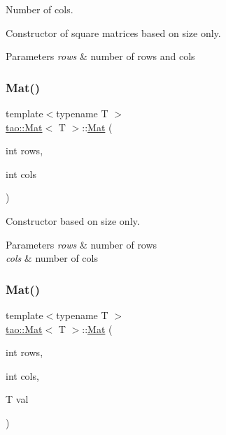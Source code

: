 Number of cols. 

Constructor of square matrices based on size only.


\begin{DoxyParams}{Parameters}
{\em rows} & number of rows and cols \\
\hline
\end{DoxyParams}
\mbox{\label{classtao_1_1_mat_a8b2f68a1f5539462e6f4186bc5f8a5c7}} 
\subsubsection{\texorpdfstring{Mat()}{Mat()}\hspace{0.1cm}{\footnotesize\ttfamily [2/5]}}
{\footnotesize\ttfamily template$<$typename T $>$ \\
\mbox{\hyperlink{classtao_1_1_mat}{tao\+::\+Mat}}$<$ T $>$\+::\mbox{\hyperlink{classtao_1_1_mat}{Mat}} (\begin{DoxyParamCaption}\item[{int}]{rows,  }\item[{int}]{cols }\end{DoxyParamCaption})}



Constructor based on size only. 


\begin{DoxyParams}{Parameters}
{\em rows} & number of rows \\
\hline
{\em cols} & number of cols \\
\hline
\end{DoxyParams}
\mbox{\label{classtao_1_1_mat_a83589751aea3dcecc363068fd540a930}} 
\subsubsection{\texorpdfstring{Mat()}{Mat()}\hspace{0.1cm}{\footnotesize\ttfamily [3/5]}}
{\footnotesize\ttfamily template$<$typename T $>$ \\
\mbox{\hyperlink{classtao_1_1_mat}{tao\+::\+Mat}}$<$ T $>$\+::\mbox{\hyperlink{classtao_1_1_mat}{Mat}} (\begin{DoxyParamCaption}\item[{int}]{rows,  }\item[{int}]{cols,  }\item[{T}]{val }\end{DoxyParamCaption})}



